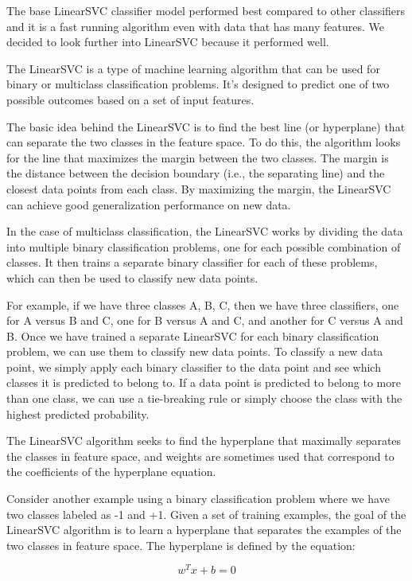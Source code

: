 The base LinearSVC classifier model performed best compared to other classifiers and it is a fast running algorithm even with data that has many features. We decided to look further into LinearSVC because it performed well. 

The LinearSVC is a type of machine learning algorithm that can be used for binary or multiclass classification problems. It's designed to predict one of two possible outcomes based on a set of input features. 

The basic idea behind the LinearSVC is to find the best line (or hyperplane) that can separate the two classes in the feature space. To do this, the algorithm looks for the line that maximizes the margin between the two classes. The margin is the distance between the decision boundary (i.e., the separating line) and the closest data points from each class. By maximizing the margin, the LinearSVC can achieve good generalization performance on new data.

In the case of multiclass classification, the LinearSVC works by dividing the data into multiple binary classification problems, one for each possible combination of classes. It then trains a separate binary classifier for each of these problems, which can then be used to classify new data points.

For example, if we have three classes A, B, C, then we have three classifiers, one for A versus B and C, one for B versus A and C, and another for C versus A and B. Once we have trained a separate LinearSVC for each binary classification problem, we can use them to classify new data points. To classify a new data point, we simply apply each binary classifier to the data point and see which classes it is predicted to belong to. If a data point is predicted to belong to more than one class, we can use a tie-breaking rule or simply choose the class with the highest predicted probability.

The LinearSVC algorithm seeks to find the hyperplane that maximally separates the classes in feature space, and weights are sometimes used that correspond to the coefficients of the hyperplane equation.

Consider another example using a binary classification problem where we have two classes labeled as -1 and +1. Given a set of training examples, the goal of the LinearSVC algorithm is to learn a hyperplane that separates the examples of the two classes in feature space. The hyperplane is defined by the equation:

\begin{equation}
w^T x + b = 0
\end{equation}

